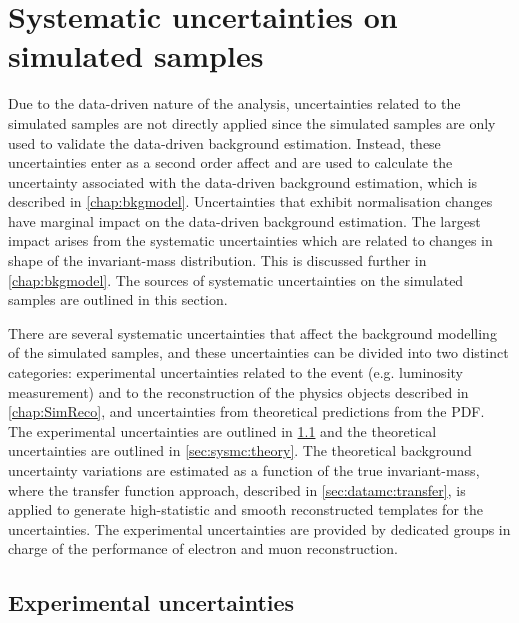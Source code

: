 \chapter{Systematic uncertainties on simulated samples}\label{chap:sysmc}

Due to the data-driven nature of the analysis, uncertainties related to the simulated samples are not directly applied since the simulated samples are only used to validate the data-driven background estimation. Instead, these uncertainties enter as a second order affect and are used to calculate the uncertainty associated with the data-driven background estimation, which is described in \cref{chap:bkgmodel}. Uncertainties that exhibit normalisation changes have marginal impact on the data-driven background estimation. The largest impact arises from the systematic uncertainties which are related to changes in shape of the invariant-mass distribution. This is discussed further in \cref{chap:bkgmodel}. The sources of systematic uncertainties on the simulated samples are outlined in this section. 

There are several systematic uncertainties that affect the background modelling of the simulated samples, and these uncertainties can be divided into two distinct categories: experimental uncertainties related to the event (e.g. luminosity measurement) and to the reconstruction of the physics objects described in \cref{chap:SimReco}, and uncertainties from theoretical predictions from the PDF. The experimental uncertainties are outlined in \cref{sec:sysmc:exp} and the theoretical uncertainties are outlined in \cref{sec:sysmc:theory}. The theoretical background uncertainty variations are estimated as a function of the true invariant-mass, where the transfer function approach, described in \cref{sec:datamc:transfer}, is applied to generate high-statistic and smooth reconstructed templates for the uncertainties. The experimental uncertainties are provided by dedicated groups in charge of the performance of electron and muon reconstruction.

\section{Experimental uncertainties}\label{sec:sysmc:exp}

